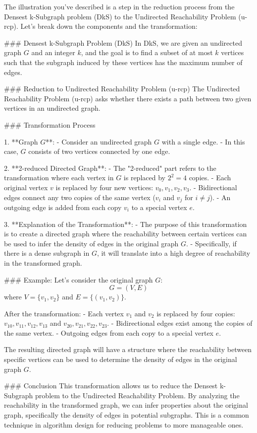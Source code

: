 The illustration you've described is a step in the reduction process from the Densest k-Subgraph problem (DkS) to the Undirected Reachability Problem (u-rcp). Let's break down the components and the transformation:

### Densest k-Subgraph Problem (DkS)
In DkS, we are given an undirected graph \( G \) and an integer \( k \), and the goal is to find a subset of at most \( k \) vertices such that the subgraph induced by these vertices has the maximum number of edges.

### Reduction to Undirected Reachability Problem (u-rcp)
The Undirected Reachability Problem (u-rcp) asks whether there exists a path between two given vertices in an undirected graph.

### Transformation Process

1. **Graph \( G \)**:
   - Consider an undirected graph \( G \) with a single edge.
   - In this case, \( G \) consists of two vertices connected by one edge.

2. **2-reduced Directed Graph**:
   - The "2-reduced" part refers to the transformation where each vertex in \( G \) is replaced by \( 2^2 = 4 \) copies.
   - Each original vertex \( v \) is replaced by four new vertices: \( v_0, v_1, v_2, v_3 \).
   - Bidirectional edges connect any two copies of the same vertex (\( v_i \) and \( v_j \) for \( i \neq j \)).
   - An outgoing edge is added from each copy \( v_i \) to a special vertex \( e \).

3. **Explanation of the Transformation**:
   - The purpose of this transformation is to create a directed graph where the reachability between certain vertices can be used to infer the density of edges in the original graph \( G \).
   - Specifically, if there is a dense subgraph in \( G \), it will translate into a high degree of reachability in the transformed graph.

### Example:
Let's consider the original graph \( G \):
\[ G = (V, E) \]
where \( V = \{v_1, v_2\} \) and \( E = \{(v_1, v_2)\} \).

After the transformation:
- Each vertex \( v_1 \) and \( v_2 \) is replaced by four copies: \( v_{10}, v_{11}, v_{12}, v_{13} \) and \( v_{20}, v_{21}, v_{22}, v_{23} \).
- Bidirectional edges exist among the copies of the same vertex.
- Outgoing edges from each copy to a special vertex \( e \).

The resulting directed graph will have a structure where the reachability between specific vertices can be used to determine the density of edges in the original graph \( G \).

### Conclusion
This transformation allows us to reduce the Densest k-Subgraph problem to the Undirected Reachability Problem. By analyzing the reachability in the transformed graph, we can infer properties about the original graph, specifically the density of edges in potential subgraphs. This is a common technique in algorithm design for reducing problems to more manageable ones.